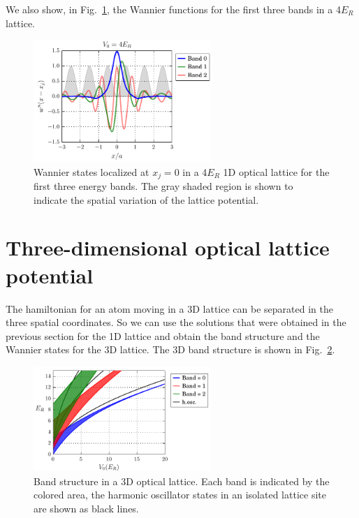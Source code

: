 \documentclass[oneside,11pt]{memoir}
\begin{document}
We also show, in Fig.~\ref{fig:wannier1d_bands}, the Wannier functions for the
first three bands in a 4$E_{R}$ lattice.  
\begin{figure}
\centering
\includegraphics[width=0.6\textwidth]{../figures/BandStructure_figures/wannier1d_bands.pdf}
\caption[Wannier states in 1D lattice for the first three energy bands.]{\small
Wannier states localized at $x_{j}=0$  in a 4$E_{R}$ 1D optical lattice for the
first three energy bands.  The gray shaded region is shown to  indicate the
spatial variation of the lattice potential.  } \label{fig:wannier1d_bands}
\end{figure}

\section{Three-dimensional optical lattice potential}

The hamiltonian for an atom moving in a  3D lattice can be separated in the
three spatial coordinates.  So we can use the solutions that were obtained in
the previous section for the 1D lattice and obtain the band structure and the
Wannier states for the 3D lattice.   The 3D band structure is shown in
Fig.~\ref{fig:bands3d_V0}. 
\begin{figure}
\centering \includegraphics[width=0.6\textwidth]{../figures/BandStructure_figures/bands3d_V0.pdf}
\caption[Band structure in 3D lattice.]{\small Band structure in a 3D optical
lattice.  Each band is indicated by the colored area,  the harmonic oscillator
states in an isolated lattice site are shown as black lines. }
\label{fig:bands3d_V0}
\end{figure}
\end{document}
